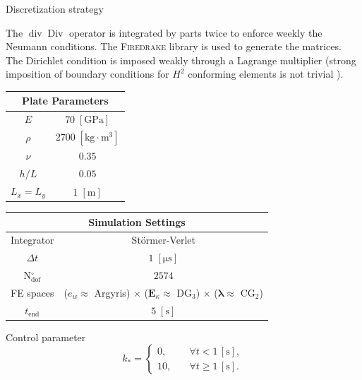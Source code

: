 \documentclass[aspectratio=169]{ISAE-Beamer}
\DeclareMathOperator*{\Div}{Div}
\renewcommand{\div}{\operatorname{div}}
\newcommand{\firedrake}{\textsc{Firedrake}\xspace}
\begin{document}
\begin{frame}{Discretization strategy}

The $\div\Div$ operator is integrated by parts twice to enforce weekly the Neumann conditions. The \firedrake library is used to generate the matrices. The Dirichlet condition is imposed weakly through a Lagrange multiplier (strong imposition of boundary conditions for $H^2$ conforming elements is not trivial ). 

\begin{table}[t]
	\centering
	\begin{tabular}{|c|c|}
		\hline 
		\multicolumn{2}{|c|}{Plate Parameters} \\ 
		\hline 
		$E$ & $70\; \mathrm{[GPa]}$ \\ 
		$\rho$ & $2700\; \mathrm{[kg \cdot m^3]}$ \\ 
		$\nu$& $0.35$ \\ 
		$h/L$& $0.05$ \\ 
		$L_x = L_y$& $1\; \mathrm{[m]}$\\ 
		\hline 
	\end{tabular} \hspace{.1cm}
	\begin{tabular}{|c|c|}
		\hline 
		\multicolumn{2}{|c|}{Simulation Settings} \\
		\hline 
		Integrator & St\"ormer-Verlet \\
		$\Delta t $ & $1 \; \mathrm{[\mu s]}$ \\  
		N$_{\text{dof}}^\circ$ & $2574$ \\
		FE spaces & ($e_w \approx $ Argyris) $\times$ ($\bm{E}_\kappa \approx$ DG$_3$) $\times$ ($\bm{\lambda} \approx$ CG$_2$)\\
		$t_{\text{end}}$ & $5\; \mathrm{[s]}$\\ 
		\hline 
	\end{tabular} 
\end{table}

	Control parameter 
	\begin{equation*}
	k_* = 
	\begin{cases}
	0, \quad &\forall t < 1 \, [\mathrm{s}], \\
	10, \quad &\forall t \ge 1 \, [\mathrm{s}].
	\end{cases}
	\end{equation*}

	
\end{frame}
\end{document}
